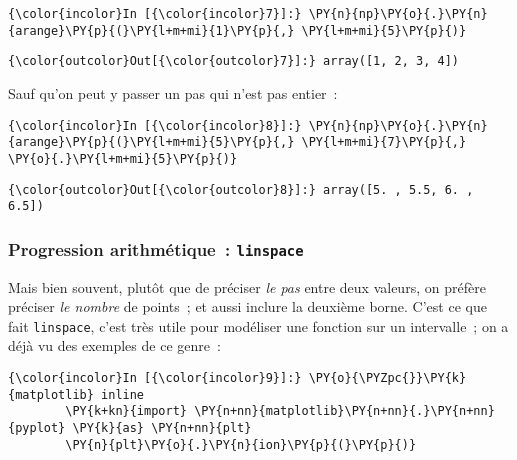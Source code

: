     \begin{Verbatim}[commandchars=\\\{\},frame=single,framerule=0.3mm,rulecolor=\color{cellframecolor}]
{\color{incolor}In [{\color{incolor}7}]:} \PY{n}{np}\PY{o}{.}\PY{n}{arange}\PY{p}{(}\PY{l+m+mi}{1}\PY{p}{,} \PY{l+m+mi}{5}\PY{p}{)}
\end{Verbatim}


\begin{Verbatim}[commandchars=\\\{\},frame=single,framerule=0.3mm,rulecolor=\color{cellframecolor}]
{\color{outcolor}Out[{\color{outcolor}7}]:} array([1, 2, 3, 4])
\end{Verbatim}
            
    Sauf qu'on peut y passer un pas qui n'est pas entier~:

    \begin{Verbatim}[commandchars=\\\{\},frame=single,framerule=0.3mm,rulecolor=\color{cellframecolor}]
{\color{incolor}In [{\color{incolor}8}]:} \PY{n}{np}\PY{o}{.}\PY{n}{arange}\PY{p}{(}\PY{l+m+mi}{5}\PY{p}{,} \PY{l+m+mi}{7}\PY{p}{,} \PY{o}{.}\PY{l+m+mi}{5}\PY{p}{)}
\end{Verbatim}


\begin{Verbatim}[commandchars=\\\{\},frame=single,framerule=0.3mm,rulecolor=\color{cellframecolor}]
{\color{outcolor}Out[{\color{outcolor}8}]:} array([5. , 5.5, 6. , 6.5])
\end{Verbatim}
            
    \hypertarget{progression-arithmuxe9tique-linspace}{%
\subsubsection{\texorpdfstring{Progression arithmétique~:
\texttt{linspace}}{Progression arithmétique~: linspace}}\label{progression-arithmuxe9tique-linspace}}

    Mais bien souvent, plutôt que de préciser \emph{le pas} entre deux
valeurs, on préfère préciser \emph{le nombre} de points~; et aussi
inclure la deuxième borne. C'est ce que fait \texttt{linspace}, c'est
très utile pour modéliser une fonction sur un intervalle~; on a déjà vu
des exemples de ce genre~:

    \begin{Verbatim}[commandchars=\\\{\},frame=single,framerule=0.3mm,rulecolor=\color{cellframecolor}]
{\color{incolor}In [{\color{incolor}9}]:} \PY{o}{\PYZpc{}}\PY{k}{matplotlib} inline
        \PY{k+kn}{import} \PY{n+nn}{matplotlib}\PY{n+nn}{.}\PY{n+nn}{pyplot} \PY{k}{as} \PY{n+nn}{plt}
        \PY{n}{plt}\PY{o}{.}\PY{n}{ion}\PY{p}{(}\PY{p}{)}
\end{Verbatim}


